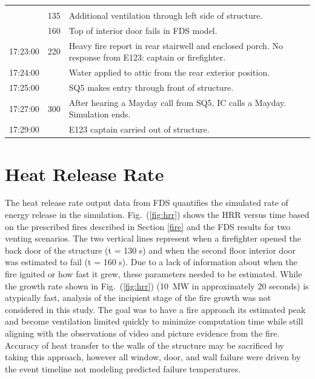 \documentclass[11pt,oneside]{book}
\begin{document}
\begin{table}
\begin{tabular}{l l l}
        &  & \\[.25cm]
        & 135 & Additional ventilation through left side of structure. \\[.25cm] 
        & 160 & Top of interior door fails in FDS model. \\[.25cm] 
\multirow{2}{*}{17:23:00}    & \multirow{2}{*}{220} & \multirow{2}{*}{\parbox{9cm} {Heavy fire report in rear stairwell and enclosed porch. No response from E123: captain or firefighter.}} \\
         & & \\[.25cm]
17:24:00    &   & Water applied to attic from the rear exterior position. \\[.25cm]
17:25:00    &   & SQ5 makes entry through front of structure. \\[.25cm]
\multirow{2}{*}{17:27:00}    & \multirow{2}{*}{300}  & \multirow{2}{*}{\parbox{9cm} {After hearing a Mayday call from SQ5, IC calls a Mayday. Simulation ends.}}\\
         & &  \\[.25cm]
17:29:00    &   & E123 captain carried out of structure. \\
\bottomrule[1.25pt]
\end{tabular}\par
\end{table}


\section{Heat Release Rate}
\label{HRR}
The heat release rate output data from FDS quantifies the simulated rate of energy release in the simulation. Fig.~(\ref{fig:hrr}) shows the HRR versus time based on the prescribed fires described in Section \ref{fire} and the FDS results for two venting scenarios. The two vertical lines represent when a firefighter opened the back door of the structure (t = 130 s) and when the second floor interior door was estimated to fail (t = 160 s). Due to a lack of information about when the fire ignited or how fast it grew, these parameters needed to be estimated.  While the growth rate shown in Fig.~(\ref{fig:hrr}) (10~MW in approximately 20 seconds) is atypically fast, analysis of the incipient stage of the fire growth was not considered in this study. The goal was to have a fire approach its estimated peak and become ventilation limited quickly to minimize computation time while still aligning with the observations of video and picture evidence from the fire. Accuracy of heat transfer to the walls of the structure may be sacrificed by taking this approach, however all window, door, and wall failure were driven by the event timeline not modeling predicted failure temperatures.
\end{document}
